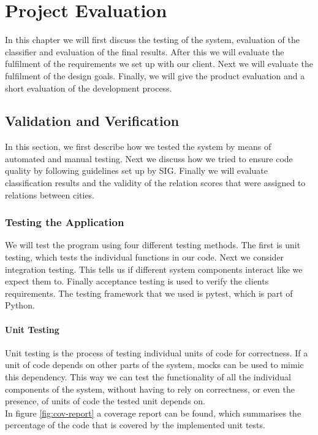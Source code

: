 \chapter{Project Evaluation}\label{sec:project-evaluation}
In this chapter we will first discuss the testing of the system, evaluation of the classifier and evaluation of the final results. After this we will evaluate the fulfilment of the requirements we set up with our client. Next we will evaluate the fulfilment of the design goals. Finally, we will give the product evaluation and a short evaluation of the development process.

\section{Validation and Verification}
In this section, we first describe how we tested the system by means of automated and manual testing. Next we discuss how we tried to ensure code quality by following guidelines set up by SIG\cite{sig}. Finally we will evaluate classification results and the validity of the relation scores that were assigned to relations between cities.

\subsection{Testing the Application}
We will test the program using four different testing methods. The first is unit testing, which tests the individual functions in our code. Next we consider integration testing. This tells us if different system components interact like we expect them to. Finally acceptance testing is used to verify the clients requirements. The testing framework that we used is pytest\cite{pytest}, which is part of Python.

\subsubsection{Unit Testing}
Unit testing is the process of testing individual units of code for correctness. If a unit of code depends on other parts of the system, mocks can be used to mimic this dependency. This way we can test the functionality of all the individual components of the system, without having to rely on correctness, or even the presence, of units of code the tested unit depends on.\\
In figure \ref{fig:cov-report} a coverage report can be found, which summarises the percentage of the code that is covered by the implemented unit tests.

